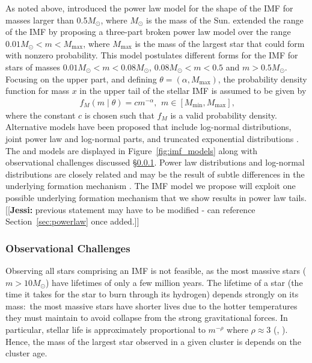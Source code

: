 \documentclass[12pt]{article}
\newcommand{\jessi}[1]{{\color{blue}[[\textbf{Jessi: }#1]]}}
\newcommand{\Msun}{M_{\odot}}
\newcommand{\Mmax}{M_{\text{max}}}
\newcommand{\Mmin}{M_{\text{min}}}
\begin{document}
As noted above, \cite{salpeter55} introduced the power law model for the shape of the IMF for masses larger
than 0.5$\Msun$, where $\Msun$ is the mass of the Sun.
\cite{kroupa2001} extended the range of the IMF by proposing a three-part broken power law model 
over the range $0.01 \Msun < m < \Mmax$, where $\Mmax$ is the mass of the largest star that could form with nonzero probability.
This model postulates different forms for the IMF for stars of masses $0.01 \Msun < m < 0.08 \Msun$,
$0.08 \Msun < m < 0.5$ and $m > 0.5\Msun$.
Focusing on the upper part, and defining $\theta = (\alpha, \Mmax)$, the probability density function for mass $x$ in the upper tail of the stellar IMF is assumed to be given by
\begin{align}
	f_M(m \mid \theta) = cm^{-\alpha}\text{,}\;\; m \in [\Mmin, \Mmax]\text{,}
	\label{eq:imf}
\end{align}
where the constant $c$ is chosen such that $f_M$ is a valid probability density.  Alternative models have been proposed that include log-normal distributions, joint power law and log-normal parts, and truncated exponential distributions  \citep{Chabrier:2003om, Chabrier:2003oq, chabrier2005,IMF50,bastian2010, OffnerEtAl2014}.  The \cite{kroupa2001} and \cite{Chabrier:2003om, Chabrier:2003oq} models are displayed in Figure~\ref{fig:imf_models} along with observational challenges discussed \S\ref{sec:observational}.
Power law distributions and log-normal distributions are closely related and may be the result of subtle differences in the underlying formation mechanism \citep{Mitzenmacher2004}.  The IMF model we propose will exploit one possible underlying formation mechanism that we show results in power law tails. \jessi{previous statement may have to be modified - can reference Section~\ref{sec:powerlaw} once added.}






\subsubsection{Observational Challenges} \label{sec:observational}
Observing all stars comprising an IMF 
is not feasible, as the most massive stars ($m > 10 \Msun$) have lifetimes of 
only a few million years.
The lifetime of a star (the time it takes for the star to burn through its
hydrogen) depends strongly on its mass:~the most massive
stars have shorter lives due to the hotter temperatures they must maintain
to avoid collapse from the strong gravitational forces. In particular,
stellar life is 
approximately proportional to $m^{-\rho}$ 
where $\rho \approx 3$ (\citealt[p. 30]{hansen2004}, \citealt[p. 439]{Chaisson:2011}). 
Hence, the mass of the largest star observed in a given 
cluster is depends on the cluster age.  %
\end{document}
